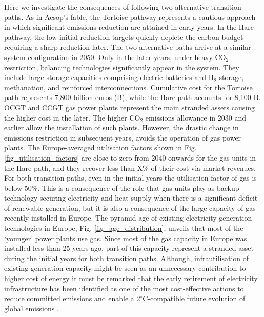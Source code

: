 \documentclass[5p]{elsarticle} %
\begin{document}
Here we investigate the consequences of following two alternative transition paths. As in Aesop's fable, the Tortoise pathway represents a cautious approach in which significant emissions reduction are attained in early years. In the Hare pathway, the low initial reduction targets quickly deplete the carbon budget requiring a sharp reduction later. The two alternative paths arrive at a similar system configuration in 2050. Only in the later years, under heavy CO$_2$ restriction, balancing technologies significantly appear in the system. They include large storage capacities comprising electric batteries and H$_2$ storage, methanation, and reinforced interconnections.  Cumulative cost for the Tortoise path represents 7,800 billion euros (B\EUR), while the Hare path accounts for 8,100 B\EUR. OCGT and CCGT gas power plants represent the main stranded assets causing the higher cost in the later. The higher CO$_2$ emissions allowance in 2030 and earlier allow the installation of such plants. However, the drastic change in emissions restriction in subsequent years, avoids the operation of gas power plants. The Europe-averaged utilisation factors shown in Fig. \ref{fig_utilisation_factors} are close to zero from 2040 onwards for the gas units in the Hare path, and they recover less than \textcolor[rgb]{1,0,0}{X\%} of their cost via market revenues. For both transition paths, even in the initial years the utilisation factor of gas is below 50\%. This is a consequence of the role that gas units play as backup technology securing electricity and heat supply when there is a significant deficit of renewable generation, but it is also a consequence of the large capacity of gas recently installed in Europe. The pyramid age of existing electricity generation technologies in Europe, Fig. \ref{fig_age_distribution}, unveils that most of the `younger' power plants use gas. Since most of the gas capacity in Europe was installed less than 25 years ago, part of this capacity represent a stranded asset during the initial years for both transition paths. Although, infrautilisation of existing generation capacity might be seen as an unnecessary contribution to higher cost of energy it must be remarked that the early retirement of electricity infrastructure has been identified as one of the most cost-effective actions to reduce committed emissions and enable a 2$^{\circ}$C-compatible future evolution of global emissions \cite{Tong_2019}.
\end{document}
